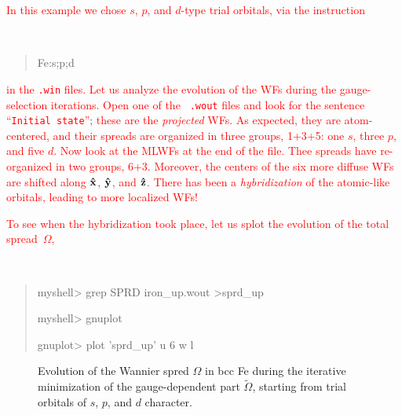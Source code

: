 \documentclass[a4paper,11pt,twoside]{article}
\def\tent#1{\textcolor{red}{#1}}     %
\begin{document}
\tent{In this example we chose $s$, $p$, and $d$-type trial orbitals,
  via the instruction} {\tt
\begin{quote}
Fe:s;p;d

\end{quote}
} \tent{in the {\tt .win} files. Let us analyze the evolution of the
  WFs during the gauge-selection iterations. Open one of the {\tt
    .wout} files and look for the sentence ``{\tt Initial state}'';
  these are the {\it projected} WFs. As expected, they are
  atom-centered, and their spreads are organized in three groups,
  1+3+5: one $s$, three $p$, and five $d$.  Now look at the MLWFs at
  the end of the file.  Thee spreads have re-organized in two groups,
  6+3.  Moreover, the centers of the six more diffuse WFs are shifted
  along ${\bf \hat{x}}$, ${\bf \hat{y}}$, and ${\bf \hat{z}}$.  There
  has been a {\it hybridization} of the atomic-like orbitals, leading
  to more localized WFs!}

\tent{To see when the hybridization took place, let us splot the
evolution of the total spread~$\Omega$,}
{\tt
\begin{quote}
myshell> grep SPRD iron\_up.wout >sprd\_up

myshell> gnuplot

gnuplot> plot 'sprd\_up' u 6  w l

\end{quote}
}

\begin{figure}[h]
\begin{center}
\caption{Evolution of the Wannier spred $\Omega$ in bcc Fe during the
iterative minimization of the gauge-dependent part $\widetilde{\Omega}$,
starting from trial orbitals of $s$, $p$, and $d$ character.} 
\label{fig:Fe-sprd}
\end{center}
\end{figure}
\end{document}
